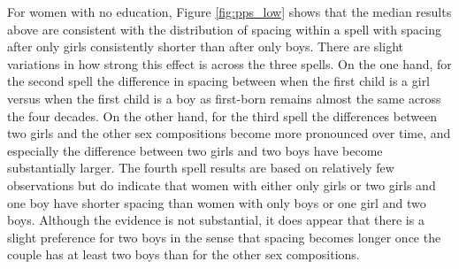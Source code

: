 \documentclass[12pt,letterpaper]{article}
\begin{document}
For women with no education, Figure \ref{fig:pps_low} shows that the median results
above are consistent with the distribution of spacing within a spell with spacing 
after only girls consistently shorter than after only boys.
There are slight variations in how strong this effect is across the three spells.
On the one hand, for the second spell the difference in spacing between
when the first child is a girl versus when the first child is a boy as
first-born remains almost the same across the four decades.
On the other hand, for the third spell the differences between two girls and 
the other sex compositions become more pronounced over time, and especially
the difference between two girls and two boys have become substantially larger.
The fourth spell results are based on relatively few observations but do
indicate that women with either only girls or two girls and one boy have
shorter spacing than women with only boys or one girl and two boys.
Although the evidence is not substantial, it does appear that there is a slight
preference for two boys in the sense that spacing becomes longer once the couple
has at least two boys than for the other sex compositions.
\end{document}
